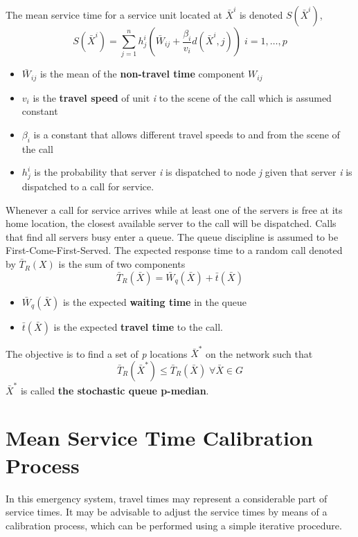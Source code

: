 The mean service time 
for a service unit located at $\bar{X}^i$ 
is denoted $S(\bar{X}^i)$,
\begin{equation}
  S(\bar{X}^i) =
  \sum_{j = 1}^{n} {
    h_j^i\left(
    \bar{W}_{ij}
    +\frac{{\beta}_i}{v_i}d(\bar{X}^i,j)
    \right)
  } \; i=1,\ldots,p
\end{equation}
\begin{itemize}
\item $\bar{W}_{ij}$ is the mean
  of the \textbf{non-travel time} component $W_{ij}$
\item $v_i$ is the \textbf{travel speed} of unit \textit{i}
  to the scene of the call
  which is assumed constant
\item $\beta_i$ is a constant
  that allows different travel speeds
  to and from the scene of the call
\item $h_j^i$ is the probability that server \textit{i} 
  is dispatched to node \textit{j}
  given that server \textit{i}
  is dispatched to a call for service.
\end{itemize}

Whenever a call for service arrives 
while at least one of the servers
is free at its home location,
the closest available server to the call
will be dispatched.
Calls that find
all servers busy
enter a queue.
The queue discipline is assumed to be
First-Come-First-Served.
The expected response time
to a random call
denoted by $\bar{T}_R(X)$
is the sum of two components
\begin{equation*}
  \bar{T}_R(\bar{X}) = \bar{W}_q(\bar{X})+\bar{t}(\bar{X})
\end{equation*}
\begin{itemize}
\item $\bar{W}_q(\bar{X})$ is the expected \textbf{waiting time} in the queue
\item $\bar{t}(\bar{X})$ is the expected \textbf{travel time} to the call.
\end{itemize}
The objective is to find
a set of \textit{p} locations $\bar{X}^*$
on the network
such that
\begin{equation*}
  \bar{T}_R(\bar{X}^*) \leq \bar{T}_R(\bar{X}) \; \forall \bar{X} \in G
\end{equation*}
$\bar{X}^*$ is called \textbf{the stochastic queue p-median}.

\section{Mean Service Time Calibration Process}
In this emergency system, 
travel times may represent a considerable part of service times. 
It may be advisable
to adjust the service times by means of a calibration process,
which can be performed using a simple iterative procedure.


